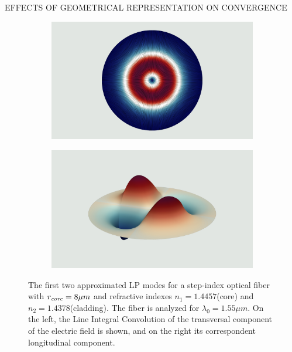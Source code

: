 \documentclass[debug]{beamer} %
\begin{document}
\begin{frame}
\begin{minipage}[t]{0.45\textwidth}
\begin{block}{\boxnumber EFFECTS OF GEOMETRICAL REPRESENTATION ON CONVERGENCE}
\begin{figure}[hb]
\begin{mdframed}[backgroundcolor=bggrey]
					\begin{subfigure}[b]{.4999\textwidth}
						\centering
						\includegraphics[width=1\linewidth]{images/et3posterStepFiber.png}%
					\end{subfigure}\hfill
					\begin{subfigure}[b]{.4999\textwidth}
						\centering
						\includegraphics[width=1\linewidth]{images/ez3posterStepFiber.png}%
					\end{subfigure}
				\end{mdframed}
				\caption{The first two approximated LP modes for a step-index optical fiber with $r_{\text{\emph{core}}}=8\mu m$ and refractive indexes $n_1 =1.4457$(core) and $n_2 =1.4378$(cladding). The fiber is analyzed for $\lambda_0=1.55\mu m$. On the left, the Line Integral Convolution of the transversal component of the electric field is shown, and on the right its correspondent longitudinal component.}
				\label{fig:plot-step}
			\end{figure}
		\end{block}
    \end{minipage}\hspace{2cm}%

\end{frame}
\end{document}
